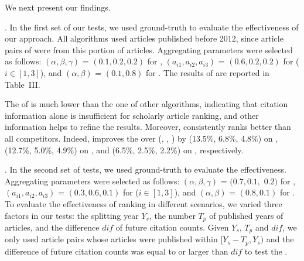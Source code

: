 We next present our findings.

.
In the first set of our tests, we used ground-truth \recom to evaluate the effectiveness of our approach.
All algorithms used articles published before 2012, since article pairs of \recom were from this portion of articles.
Aggregating parameters were selected as follows: $(\alpha,\beta,\gamma)$ = $(0.1, 0.2, 0.2)$ for \futurerank, $(a_{i1},a_{i2},a_{i3})$ = $(0.6, 0.2, 0.2)$ for \hhgrank ($i\in[1,3]$), and $(\alpha,\beta)$ = $(0.1, 0.8)$ for \ensemblerank.
The results of \PairAcc are reported in Table~III.

The \PairAcc of \pagerank is much lower than the one of other algorithms, indicating that citation information alone is insufficient for scholarly article ranking, and other information helps to refine the results. Moreover, \ensemblerank consistently ranks better than all competitors. Indeed, \ensemblerank improves the \PairAcc over (\pagerank, \futurerank, \hhgrank) by (13.5\%, 6.8\%, 4.8\%) on \aan, (12.7\%, 5.0\%, 4.9\%) on \aminer, and (6.5\%, 2.5\%, 2.2\%) on \magdata, respectively.

.
In the second set of tests, we used ground-truth \fcita to evaluate the effectiveness.
Aggregating parameters were selected as follows: $(\alpha, \beta, \gamma)$ = $(0.7, 0.1,$ $0.2)$ for \futurerank, $(a_{i1}, a_{i2}, a_{i3})$ = $(0.3, 0.6, 0.1)$ for \hhgrank ($i\in[1, 3]$), and $(\alpha, \beta)$ = $(0.8, 0.1)$ for \ensemblerank.
To evaluate the effectiveness of ranking in different scenarios, we varied three factors in our tests: the splitting year $Y_s$, the number $T_p$ of published years of articles, and the difference $dif$ of future citation counts.
%
Given $Y_s$, $T_p$ and $dif$, we only used article pairs whose articles were published within $[Y_s - T_p, Y_s)$ and the difference of future citation counts was equal to or larger than $dif$ to test the \PairAcc.




